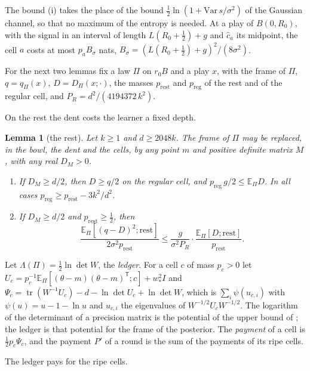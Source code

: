 \documentclass[11pt]{amsart}
\newtheorem{lemma}[theorem]{Lemma}
\theoremstyle{definition}
\numberwithin{equation}{section}
\newcommand{\E}{\mathbb{E}}
\newcommand{\tr}{\operatorname{tr}}
\begin{document}
The bound (i) takes the place of the bound $\frac12\ln(1+\mathrm{Var}\,s/\sigma^2)$ of the Gaussian channel, so that no maximum of the entropy is needed. At a play of $B(0,R_0)$, with the signal in an interval of length $L(R_0+\frac12)+g$ and $\hat c_a$ its midpoint, the cell $a$ costs at most $p_aB_\sigma$ nats, $B_\sigma=(L(R_0+\frac12)+g)^2/(8\sigma^2)$.

For the next two lemmas fix a law $\Pi$ on $r_0B$ and a play $x$, with the frame of $\Pi$, $q=q_\Pi(x)$, $D=D_\Pi(x;\cdot)$, the masses $p_{\mathrm{rest}}$ and $p_{\mathrm{reg}}$ of the rest and of the regular cell, and $P_R=d^2/(4194372\,k^2)$.

On the rest the dent costs the learner a fixed depth.

\begin{lemma}[the rest]\label{lem:rest}
Let $k\ge1$ and $d\ge2048k$. The frame of $\Pi$ may be replaced, in the bowl, the dent and the cells, by any point $m$ and positive definite matrix $M$, with any real $D_M>0$.
\begin{enumerate}[label=(\roman*)]
\item If $D_M\ge d/2$, then $D\ge q/2$ on the regular cell, and $p_{\mathrm{reg}}\,g/2\le\E_\Pi D$. In all cases $p_{\mathrm{reg}}\ge p_{\mathrm{rest}}-3k^2/d^2$.
\item If $D_M\ge d/2$ and $p_{\mathrm{rest}}\ge\frac12$, then
\[
\frac{\E_\Pi[(q-D)^2;\mathrm{rest}]}{2\sigma^2p_{\mathrm{rest}}}\le\frac{g}{\sigma^2P_R}\cdot\frac{\E_\Pi[D;\mathrm{rest}]}{p_{\mathrm{rest}}}.
\]
\end{enumerate}
\end{lemma}

Let $\Lambda(\Pi)=\frac12\ln\det W$, the \emph{ledger}. For a cell $c$ of mass $p_c>0$ let $U_c=p_c^{-1}\E_\Pi[(\theta-m)(\theta-m)^{\mathsf T};c]+w_*^2I$ and $\Psi_c=\tr(W^{-1}U_c)-d-\ln\det U_c+\ln\det W$, which is $\sum_i\psi(u_{c,i})$ with $\psi(u)=u-1-\ln u$ and $u_{c,i}$ the eigenvalues of $W^{-1/2}U_cW^{-1/2}$. The logarithm of the determinant of a precision matrix is the potential of the upper bound of \cite[Section~5.1]{DHK08}; the ledger is that potential for the frame of the posterior. The \emph{payment} of a cell is $\frac12p_c\Psi_c$, and the payment $P'$ of a round is the sum of the payments of its ripe cells.

The ledger pays for the ripe cells.
\end{document}
